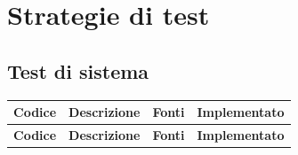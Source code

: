 \documentclass[a4paper,12pt]{article}
\begin{document}
\section{Strategie di test}

\subsection{Test di sistema}


\setlength{\LTleft}{-0.4cm}
\renewcommand{\arraystretch}{1.2}
\begin{longtable}{|p{1.5cm}|p{8.3cm}|p{2.4cm}|c|}
\hline
\rowcolor{zpusgreen!30}
\textbf{Codice} & \textbf{Descrizione} & \textbf{Fonti} & \textbf{Implementato} \\
\hline
\endfirsthead
\rowcolor{zpusgreen!30}
\textbf{Codice} & \textbf{Descrizione} & \textbf{Fonti} & \textbf{Implementato} \\
\hline
\endhead


\end{longtable}
\end{document}
